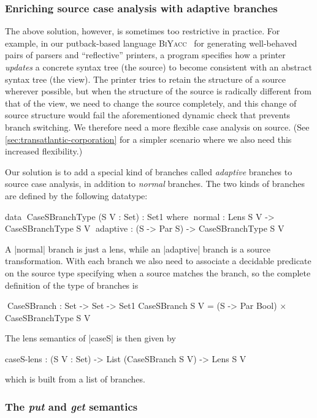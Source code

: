 \documentclass{sigplanconf}
\renewcommand{\emph}{\textsl}
\newcommand{\BiYacc}{\textsc{BiYacc}}
\begin{document}
\subsubsection{Enriching source case analysis with adaptive branches}

The above solution, however, is sometimes too restrictive in practice.
For example, in our putback-based language \BiYacc~\cite{Zhu-BiYacc} for generating well-behaved pairs of parsers and ``reflective'' printers, a program specifies how a printer \emph{updates} a concrete syntax tree (the source) to become consistent with an abstract syntax tree (the view).
The printer tries to retain the structure of a source wherever possible, but when the structure of the source is radically different from that of the view, we need to change the source completely, and this change of source structure would fail the aforementioned dynamic check that prevents branch switching.
We therefore need a more flexible case analysis on source.
(See \autoref{sec:transatlantic-corporation} for a simpler scenario where we also need this increased flexibility.)

Our solution is to add a special kind of branches called \emph{adaptive} branches to source case analysis, in addition to \emph{normal} branches.
The two kinds of branches are defined by the following datatype:
\begin{code}
data ^^^CaseSBranchType (S V : Set) : Set1 where
  ^^^normal    : Lens S V      -> CaseSBranchType S V
  ^^^adaptive  : (S -> Par S)  -> CaseSBranchType S V
\end{code}
A |normal| branch is just a lens, while an |adaptive| branch is a source transformation.
With each branch we also need to associate a decidable predicate on the source type specifying when a source matches the branch, so the complete definition of the type of branches is
\begin{code}
^^^CaseSBranch : Set -> Set -> Set1
CaseSBranch S V = (S -> Par Bool) × CaseSBranchType S V
\end{code}
The lens semantics of |caseS| is then given by
\begin{code}
caseS-lens : (S V : Set) -> List (CaseSBranch S V) -> Lens S V
\end{code}
which is built from a list of branches.

\subsubsection{The \textit{put} and \textit{get} semantics}
\label{sec:caseS-put-and-get}
\end{document}
